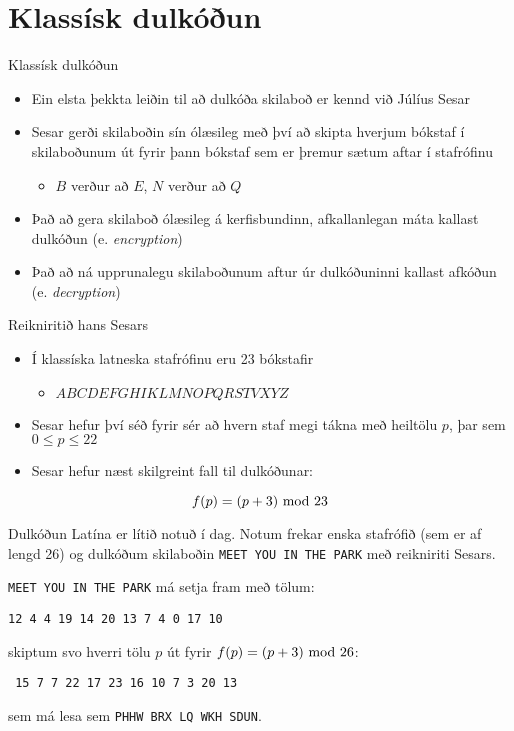 \documentclass[handout]{beamer}
\begin{document}
\section{Klassísk dulkóðun}

\begin{frame}{Klassísk dulkóðun}
\begin{itemize}
 \item Ein elsta þekkta leiðin til að dulkóða skilaboð er kennd við Júlíus Sesar
 \item Sesar gerði skilaboðin sín ólæsileg með því að skipta hverjum bókstaf í skilaboðunum út fyrir þann bókstaf sem er þremur sætum aftar í stafrófinu
 \begin{itemize}
  \item $B$ verður að $E$, $N$ verður að $Q$
 \end{itemize}
 \item Það að gera skilaboð ólæsileg á kerfisbundinn, afkallanlegan máta kallast dulkóðun (e. \emph{encryption})
 \item Það að ná upprunalegu skilaboðunum aftur úr dulkóðuninni kallast afkóðun (e. \emph{decryption})
\end{itemize}
\end{frame}

\begin{frame}{Reikniritið hans Sesars}
\begin{itemize}
 \item Í klassíska latneska stafrófinu eru 23 bókstafir
 \begin{itemize}
  \item $A	B	C	D	E	F	G	H	 I	K	L	M	N	O	P	Q	R	S	T	V	X	Y	Z$
 \end{itemize}
 \item Sesar hefur því séð fyrir sér að hvern staf megi tákna með heiltölu $p$, þar sem $0 \leq p \leq 22$
 \item Sesar hefur næst skilgreint fall til dulkóðunar:
\end{itemize}
\[
 f(p) = (p + 3) \ \text{mod}\ 23
\]
\end{frame}

\begin{frame}{Dulkóðun}
Latína er lítið notuð í dag. Notum frekar enska stafrófið (sem er af lengd 26) og dulkóðum skilaboðin \texttt{MEET YOU IN THE PARK} með reikniriti Sesars. \pause

\texttt{MEET YOU IN THE PARK} má setja fram með tölum:
\begin{center}
\texttt{12 4 4 19 14 20 13 7 4 0 17 10}
\end{center}\pause
skiptum svo hverri tölu $p$ út fyrir $f(p) = (p+3) \ \text{mod}\ 26$:
\begin{center}
\texttt{
15 7 7 22 17 23 16 10 7 3 20 13}
\end{center}
sem má lesa sem \texttt{PHHW BRX LQ WKH SDUN}.
\end{frame}
\end{document}
